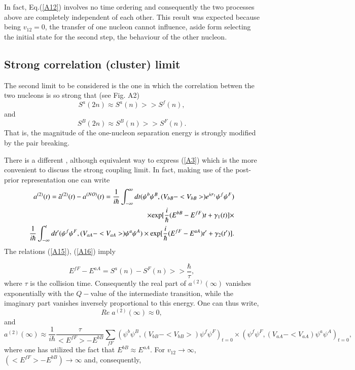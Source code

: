 \documentclass[a4paper,14pt]{article}
\begin{document}
In fact, Eq.(\ref{A12}) involves no time ordering and consequently the two processes above are completely independent of each other. 
This result was expected because being $v_{12}= 0$, the transfer of one nucleon cannot influence, aside form selecting the
initial state for the second step, the behaviour of the other nucleon.


\subsection{Strong correlation (cluster) limit}

The second limit to be considered is the one in which the correlation betwen the two nucleons is so strong that (see Fig. A2)
\begin{equation}
S^a(2n) \approx S^a(n) >> S^f(n),
\label{A15}
\end{equation}
and 
\begin{equation}
S^B(2n) \approx S^B(n) >> S^F(n).
\label{A16}
\end{equation}
That is, the magnitude of the one-nucleon separation energy is strongly modified by the pair breaking.

There is a different , although equivalent way to express (\ref{A3}) which is the more convenient to discuss the strong coupling limit.
In fact, making use of the post-prior representation one can write
\begin{eqnarray}
a^{(2)}(t) = \tilde a^{(2)}(t) - a^{(NO)}(t) = 
\frac{1}{i \hbar} \int^{\infty}_{-\infty} dt (\psi^b \psi^B, (V_{bB} - <V_{bB}>) e^{i \sigma_1} \psi^f \psi^F ) \nonumber \\ 
\times {\rm exp} [\frac{i}{\hbar} (E^{bB} - E^{fF}) t + \gamma_1(t)] \times \nonumber  \\
\frac{1}{i \hbar} \int^{t}_{-\infty} dt' (\psi^f \psi^F, (V_{aA} - <V_{aA}>) \psi^a \psi^A ) \times 
{\rm exp} [\frac{i}{\hbar} (E^{fF} - E^{aA}) t' + \gamma_2(t')].
\end{eqnarray}
The relations  (\ref{A15}), (\ref{A16}) imply 

\begin{equation}
E^{fF} - E^{aA} = S^a(n) - S^F(n) >> \frac{\hbar}{\tau},
\end{equation}
where $\tau$ is the collision time. Consequently the real part of $a^{(2)}(\infty)$ vanishes exponentially  with the $Q-$value of the intermediate transition, while the imaginary part  vanishes inversely proportional to this energy.
One can thus write,
\begin{equation}
Re \;  a^{(2)} (\infty) \approx 0,
\end{equation} 
and 
\begin{equation}
a^{(2)}(\infty) \approx \frac{1}{i \hbar} \frac{\tau}{<E^{fF}> - E^{bB}} 
\sum_{fF} (\psi^b \psi^B, 
(V_{bB}- <V_{bB}>) 
\psi^f\psi^F)_{t=0} \times 
(\psi^f\psi^F,(V_{aA} - <V_{aA}) \psi^a \psi^A)_{t=0},
\end{equation} 
where one has utilized the fact that $E^{bB} \approx E^{aA}$. For $v_{12} \to \infty$, $(<E^{fF}> - E^{bB}) \to \infty$
and, consequently, 
\end{document}
